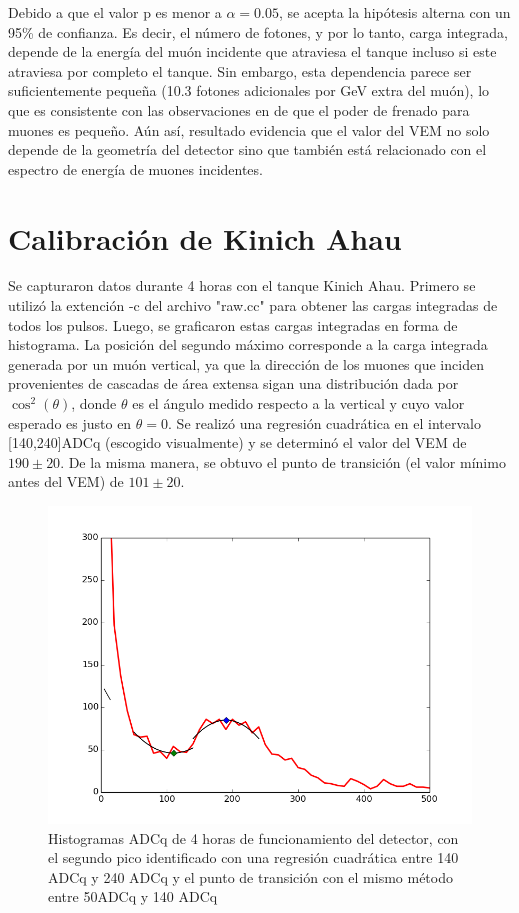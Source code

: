 \documentclass{book}
\begin{document}
Debido a que el valor p es menor a $\alpha=0.05$, se acepta la hip\'otesis alterna con un 95\% de confianza. Es decir, el n\'umero de fotones, y por lo tanto, carga integrada, depende de la energ\'ia del mu\'on incidente que atraviesa el tanque incluso si este atraviesa por completo el tanque. Sin embargo, esta dependencia parece ser suficientemente peque\~na (10.3 fotones adicionales por GeV extra del mu\'on), lo que es consistente con las observaciones en \citep{ASOREY} de que el poder de frenado para muones es peque\~no. A\'un as\'i, resultado evidencia que el valor del VEM no solo depende de la geometr\'ia del detector sino que tambi\'en est\'a relacionado con el espectro de energ\'ia de muones incidentes.

\section{Calibraci\'on de Kinich Ahau}
Se capturaron datos durante 4 horas con el tanque Kinich Ahau. Primero se utiliz\'o la extenci\'on -c del archivo "raw.cc" para obtener las cargas integradas de todos los pulsos. Luego, se graficaron estas cargas integradas en forma de histograma. La posici\'on del segundo m\'aximo corresponde a la carga integrada generada por un mu\'on vertical, ya que la direcci\'on de los muones que inciden provenientes de cascadas de \'area extensa sigan una distribuci\'on dada por $\cos^2(\theta)$, donde $\theta$ es el \'angulo medido respecto a la vertical y cuyo valor esperado es justo en $\theta=0$. Se realiz\'o una regresi\'on cuadr\'atica en el intervalo [140,240]ADCq (escogido visualmente) y se determin\'o el valor del VEM de $190 \pm 20$. De la misma manera, se obtuvo el punto de transici\'on (el valor m\'inimo antes del VEM) de $101\pm20$.

\begin{figure}[h] %
\begin{center}
 \includegraphics[width=0.7\linewidth]{ADCqCorrida1.png}
\caption{Histogramas ADCq de 4 horas de funcionamiento del detector, con el segundo pico identificado con una regresi\'on cuadr\'atica entre 140 ADCq y 240 ADCq y el punto de transici\'on con el mismo m\'etodo entre 50ADCq y 140 ADCq}
\end{center}
\end{figure}
\end{document}
